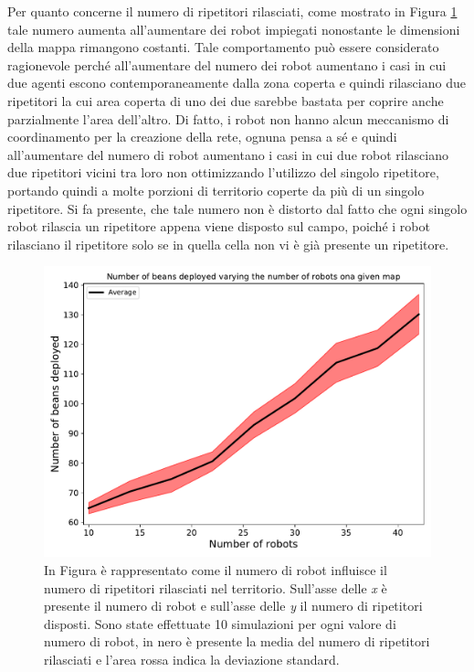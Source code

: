 Per quanto concerne il numero di ripetitori rilasciati, come mostrato in Figura \ref{fig:robotsbeans} tale numero aumenta all'aumentare dei robot impiegati nonostante le dimensioni della mappa rimangono costanti.
Tale comportamento può essere considerato ragionevole perché all'aumentare del numero dei robot aumentano i casi in cui due agenti escono contemporaneamente dalla zona coperta e quindi rilasciano due ripetitori la cui area coperta di uno dei due sarebbe bastata per coprire anche parzialmente l'area dell'altro.
Di fatto, i robot non hanno alcun meccanismo di coordinamento per la creazione della rete, ognuna pensa a sé e quindi all'aumentare del numero di robot aumentano i casi in cui due robot rilasciano due ripetitori vicini tra loro non ottimizzando l'utilizzo del singolo ripetitore, portando quindi a molte porzioni di territorio coperte da più di un singolo ripetitore.
Si fa presente, che tale numero non è distorto dal fatto che ogni singolo robot rilascia un ripetitore appena viene disposto sul campo, poiché i robot rilasciano il ripetitore solo se in quella cella non vi è già presente un ripetitore.
\begin{figure}
	\centering
	\includegraphics[width=0.9\linewidth]{images/macro_results/robots_beans}
	\caption{In Figura è rappresentato come il numero di robot influisce il numero di ripetitori rilasciati nel territorio. Sull'asse delle \textit{x} è presente il numero di robot e sull'asse delle \textit{y} il numero di ripetitori disposti. Sono state effettuate 10 simulazioni per ogni valore di numero di robot, in nero è presente la media del numero di ripetitori rilasciati e l'area rossa indica la deviazione standard.}
	\label{fig:robotsbeans}
\end{figure}

